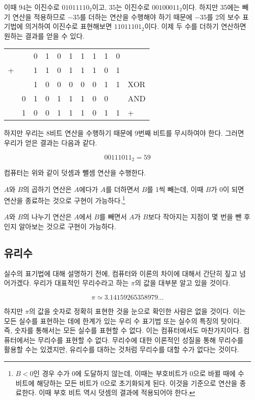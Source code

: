 \documentclass{article}
\begin{document}
이때 $94$는 이진수로 $01011110_2$이고, $35$는 이진수로 $00100011_2$이다.
하지만 35에는 빼기 연산을 적용하므로 $-35$를 더하는 연산을 수행해야 하기 때문에
$-35$를 2의 보수 표기법에 의거하여 이진수로 표현해보면 $11011101_2$이다.
이제 두 수를 더하기 연산하면 원하는 결과를 얻을 수 있다.

\begin{center}
    \begin{tabular}{ccccccccccl}
          &   & 0 & 1 & 0 & 1 & 1 & 1 & 1 & 0 & \\
        + &   & 1 & 1 & 0 & 1 & 1 & 1 & 0 & 1 & \\
        \hline
          &   & 1 & 0 & 0 & 0 & 0 & 0 & 1 & 1 & XOR \\
          & 0 & 1 & 0 & 1 & 1 & 1 & 0 & 0 &   & AND \\
        \hline
          & 1 & 0 & 0 & 1 & 1 & 1 & 0 & 1 & 1 & +
    \end{tabular}
\end{center}

하지만 우리는 8비트 연산을 수행하기 때문에 9번째 비트를 무시하여야 한다.
그러면 우리가 얻은 결과는 다음과 같다.

$$
00111011_2 = 59
$$

컴퓨터는 위와 같이 덧셈과 뺄셈 연산을 수행한다.

$A$와 $B$의 곱하기 연산은 $A$에다가 $A$를 더하면서 $B$를 1씩 빼는데,
이때 $B$가 0이 되면 연산을
종료하는 것으로 구현이 가능하다.\footnote{$B < 0$인 경우 수가 0에 도달하지 않는데, 이때는
부호비트가 0으로 바뀔 때에 수 비트에 해당하는 모든 비트가 0으로 초기화되게 된다. 이것을 기준으로
연산을 종료한다. 이때 부호 비트 역시 덧셈의 결과에 적용되어야 한다.}

$A$와 $B$의 나누기 연산은 $A$에서 $B$를 빼면서 $A$가 $B$보다 작아지는 지점이 몇 번을 뺀
후인지 알아보는 것으로 구현이 가능하다.

\subsection{유리수}

실수의 표기법에 대해 설명하기 전에, 컴퓨터와 이론의 차이에 대해서 간단히 짚고 넘어가겠다.
우리가 대표적인 무리수라고 하는 $\pi$의 값을 대부분 알고 있을 것이다.

$$
\pi \simeq 3.14159265358979 \dots
$$

하지만 $\pi$의 값을 숫자로 정확히 표현한 것을 눈으로 확인한 사람은 없을 것이다.
이는 모든 실수를 표현하는 데에 한계가 있는 우리 수 표기법 또는 실수의 특징의 탓이다.
즉, 숫자를 통해서는 모든 실수를 표현할 수 없다. 이는 컴퓨터에서도 마찬가지이다.
컴퓨터에서는 무리수를 표현할 수 없다. 무리수에 대한 이론적인 성질을 통해 무리수를 활용할 수는
있겠지만, 유리수를 대하는 것처럼 무리수를 대할 수가 없다는 것이다.
\end{document}

